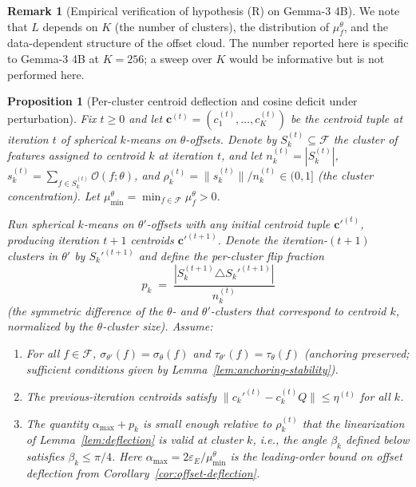 \documentclass[11pt,letterpaper]{article}
\newtheorem{proposition}[theorem]{Proposition}
\theoremstyle{definition}
\newtheorem{remark}[theorem]{Remark}
\begin{document}
\begin{remark}[Empirical verification of hypothesis (R) on Gemma-3 4B]
We note that $L$ depends on $K$ (the number of clusters), the distribution of $\mu_f^\theta$, and the data-dependent structure of the offset cloud. The number reported here is specific to Gemma-3 4B at $K = 256$; a sweep over $K$ would be informative but is not performed here.
\end{remark}

\begin{proposition}[Per-cluster centroid deflection and cosine deficit under perturbation]
\label{prop:centroid-quadratic}
Fix $t \geq 0$ and let $\mathbf{c}^{(t)} = (c_1^{(t)}, \ldots, c_K^{(t)})$ be the centroid tuple at iteration $t$ of spherical $k$-means on $\theta$-offsets. Denote by $S_k^{(t)} \subseteq \mathcal{F}$ the cluster of features assigned to centroid $k$ at iteration $t$, and let $n_k^{(t)} = |S_k^{(t)}|$, $s_k^{(t)} = \sum_{f \in S_k^{(t)}} \mathcal{O}(f; \theta)$, and $\rho_k^{(t)} = \|s_k^{(t)}\| / n_k^{(t)} \in (0, 1]$ (the cluster concentration). Let $\mu_{\min}^\theta = \min_{f \in \mathcal{F}} \mu_f^\theta > 0$.

Run spherical $k$-means on $\theta'$-offsets with any initial centroid tuple $\mathbf{c}'^{(t)}$, producing iteration $t+1$ centroids $\mathbf{c}'^{(t+1)}$. Denote the iteration-$(t+1)$ clusters in $\theta'$ by $S_k'^{(t+1)}$ and define the \emph{per-cluster flip fraction}
\[
p_k \;=\; \frac{|S_k^{(t+1)} \triangle S_k'^{(t+1)}|}{n_k^{(t)}}
\]
(the symmetric difference of the $\theta$- and $\theta'$-clusters that correspond to centroid $k$, normalized by the $\theta$-cluster size). Assume:

\begin{enumerate}[label=(A\arabic*), itemsep=0pt, leftmargin=*]
\item \label{ass:anchoring} For all $f \in \mathcal{F}$, $\sigma_{\theta'}(f) = \sigma_\theta(f)$ and $\tau_{\theta'}(f) = \tau_\theta(f)$ (anchoring preserved; sufficient conditions given by Lemma~\ref{lem:anchoring-stability}).
\item \label{ass:c-prev} The previous-iteration centroids satisfy $\|c_k'^{(t)} - c_k^{(t)} Q\| \leq \eta^{(t)}$ for all $k$.
\item \label{ass:small} The quantity $\alpha_{\max} + p_k$ is small enough relative to $\rho_k^{(t)}$ that the linearization of Lemma~\ref{lem:deflection} is valid at cluster $k$, i.e., the angle $\beta_k$ defined below satisfies $\beta_k \leq \pi/4$. Here $\alpha_{\max} = 2 \varepsilon_E / \mu_{\min}^\theta$ is the leading-order bound on offset deflection from Corollary~\ref{cor:offset-deflection}.
\end{enumerate}


\end{proposition}
\end{document}
